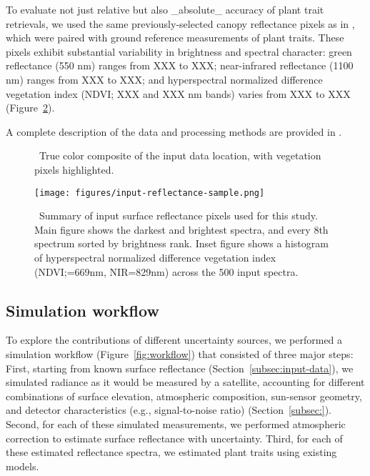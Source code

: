 \documentclass[draft]{agujournal2019}
\begin{document}
\fussy  %
To evaluate not just relative but also _absolute_ accuracy of plant trait retrievals, 
we used the same previously-selected canopy reflectance pixels as in ,
which were paired with ground reference measurements of plant traits.
These pixels exhibit substantial variability in brightness and spectral character:
green reflectance (550 nm) ranges from XXX to XXX;
near-infrared reflectance (1100 nm) ranges from XXX to XXX;
and hyperspectral normalized difference vegetation index (NDVI; XXX and XXX nm bands) varies from XXX to XXX (Figure~\ref{fig:input-summary}).

A complete description of the data and processing methods are provided in .

\begin{figure}[ht]
  \centering
  \caption{\label{fig:sitemap} \
    True color composite of the input data location, with vegetation pixels highlighted.
  }
\end{figure}

\begin{figure}[ht]
  \centering
  \texttt{[image: figures/input-reflectance-sample.png]}
  \caption{\label{fig:input-summary} \
  Summary of input surface reflectance pixels used for this study.
  Main figure shows the darkest and brightest spectra, and every 8th spectrum sorted by brightness rank.
  Inset figure shows a histogram of hyperspectral normalized difference vegetation index (NDVI;\@red=669nm, NIR=829nm) across the 500 input spectra.
  }
\end{figure}


\subsection{Simulation workflow}\label{subsec:workflow}

To explore the contributions of different uncertainty sources, we performed a simulation workflow (Figure~\ref{fig:workflow}) that consisted of three major steps:
First, starting from known surface reflectance (Section~\ref{subsec:input-data}), we simulated radiance as it would be measured by a satellite, accounting for different combinations of surface elevation, atmospheric composition, sun-sensor geometry, and detector characteristics (e.g., signal-to-noise ratio) (Section~\ref{subsec:}).
Second, for each of these simulated measurements, we performed atmospheric correction to estimate surface reflectance with uncertainty.
Third, for each of these estimated reflectance spectra, we estimated plant traits using existing models.
\end{document}
